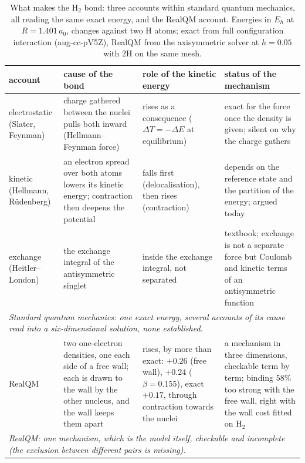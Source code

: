 \begin{table}[!htbp]
\centering
\small
\renewcommand{\arraystretch}{1.15}
\caption{What makes the H$_2$ bond: three accounts within standard quantum mechanics, all reading the same
exact energy, and the RealQM account. Energies in $E_h$ at $R=1.401\,a_0$, changes against two H atoms; exact
from full configuration interaction (aug-cc-pV5Z), RealQM from the axisymmetric solver at $h=0.05$ with $2$H on
the same mesh.}\label{tab:bondaccounts}
\begin{tabular}{p{}p{}p{}p{}}
\toprule
account & cause of the bond & role of the kinetic energy & status of the mechanism \\
\midrule
electrostatic (Slater, Feynman) & charge gathered between the nuclei pulls both inward (Hellmann--Feynman
force) & rises as a consequence ($\Delta T=-\Delta E$ at equilibrium) & exact for the force once the density is
given; silent on why the charge gathers \\
kinetic (Hellmann, R\"udenberg) & an electron spread over both atoms lowers its kinetic energy; contraction
then deepens the potential & falls first (delocalisation), then rises (contraction) & depends on the reference
state and the partition of the energy; argued today \\
exchange (Heitler--London) & the exchange integral of the antisymmetric singlet & inside the exchange
integral, not separated & textbook; exchange is not a separate force but Coulomb and kinetic terms of an
antisymmetric function \\
\multicolumn{4}{p{0.94\textwidth}}{\emph{Standard quantum mechanics: one exact energy, several accounts of its
cause read into a six-dimensional solution, none established.}} \\
\midrule
RealQM & two one-electron densities, one each side of a free wall; each is drawn to the wall by the other
nucleus, and the wall keeps them apart & rises, by more than exact: $+0.26$ (free wall), $+0.24$
($\beta=0.155$), exact $+0.17$, through contraction towards the nuclei & a mechanism in three dimensions,
checkable term by term; binding $58\%$ too strong with the free wall, right with the wall cost fitted on
H$_2$ \\
\multicolumn{4}{p{0.94\textwidth}}{\emph{RealQM: one mechanism, which is the model itself, checkable and
incomplete (the exclusion between different pairs is missing).}} \\
\bottomrule
\end{tabular}
\end{table}

